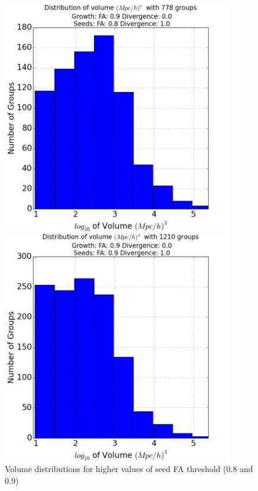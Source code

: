 \documentclass[12pt]{article}
\begin{document}
\begin{figure}[ht]
\centering
\begin{minipage}{.5\textwidth}
  \centering
  \includegraphics[width=0.9\textwidth]{groups/volumeplots/volumes_distr_Mpc_08_Trace_10_search_FA_09_Trace_00.png} %
\end{minipage}%
\begin{minipage}{.5\textwidth}
  \centering
  \includegraphics[width=0.9\textwidth]{groups/volumeplots/volumes_distr_Mpc_09_Trace_10_search_FA_09_Trace_00.png}
\end{minipage}

\caption{Volume distributions for higher values of seed FA threshold (0.8 and 0.9)}
\label{fg:volume_plots_higher}
\end{figure}
\FloatBarrier
\end{document}
